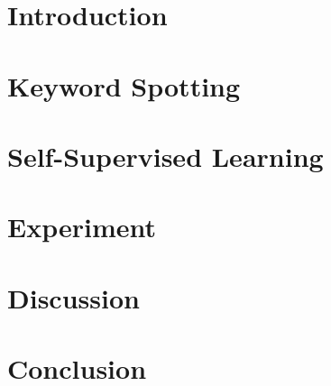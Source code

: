 \documentclass[11pt,a4paper,twoside,openright, openany]{book}
\begin{document}
\cleardoublepage
\frontmatter{}





%

\tableofcontents

\mainmatter{}

    \chapter{Introduction} \label{ch:intro}
        
    
    \chapter{Keyword Spotting}
        

    \chapter{Self-Supervised Learning} \label{ch:theory}
        

    \chapter{Experiment} \label{ch:experiment}
        
        

    \chapter{Discussion} \label{ch:discussion}
        

    \chapter{Conclusion}
        

\label{lastofmain}
\nocite{*}


\appendix


\end{document}
